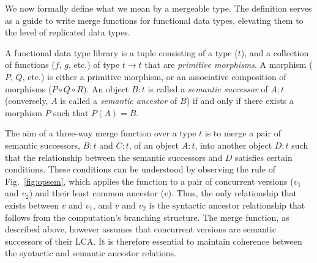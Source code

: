 We now formally define what we mean by a mergeable type. The
definition serves as a guide to write merge functions for functional
data types, elevating them to the level of replicated data types.

A functional data type library is a tuple consisting of a type ($t$),
and a collection of functions ($f$, $g$, etc.) of type $t \rightarrow
t$ that are \emph{primitive morphisms}. A morphism ($P$, $Q$, etc.) is
either a primitive morphism, or an associative composition of
morphisms ($P \circ Q \circ R$). An object $B:t$ is called a
\emph{semantic successor} of $A:t$ (conversely, $A$ is called a
\emph{semantic ancestor} of $B$) if and only if there exists a
morphism $P$ such that $P(A) = B$.

The aim of a three-way merge function over a type $t$ is to merge a
pair of semantic successors, $B:t$ and $C:t$, of an object $A:t$, into
another object $D:t$ such that the relationship between the semantic
successors and $D$ satisfies certain conditions. These conditions can
be understood by observing the  rule of
Fig.~\ref{fig:opsem}, which applies the  function to a pair
of concurrent versions ($v_1$ and $v_2$) and their least common
ancestor ($v$). Thus, the only relationship that exists between $v$
and $v_1$, and $v$ and $v_2$ is the syntactic ancestor relationship
that follows from the computation's branching structure. The merge
function, as described above, however assumes that concurrent versions
are semantic successors of their LCA.  It is therefore essential to
maintain coherence between the syntactic and semantic ancestor
relations.

